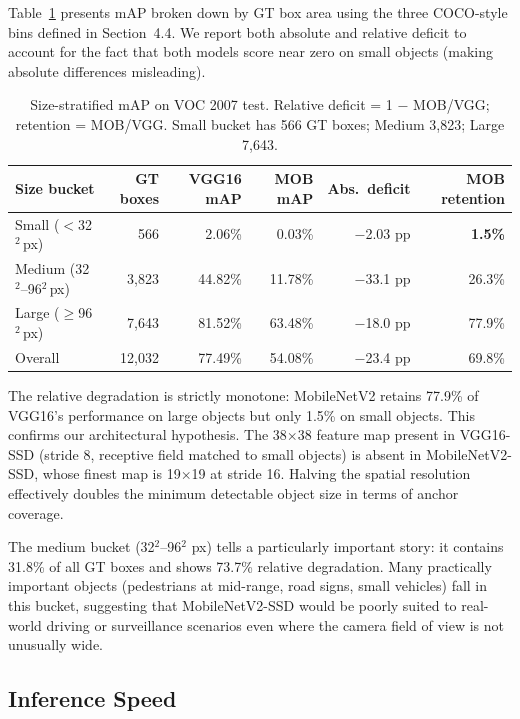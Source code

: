 \documentclass{article}
\begin{document}
Table~\ref{tab:size} presents mAP broken down by GT box area using the three COCO-style bins defined in Section~4.4. We report both absolute and relative deficit to account for the fact that both models score near zero on small objects (making absolute differences misleading).

\begin{table}[h]
  \caption{Size-stratified mAP on VOC 2007 test. Relative deficit = 1 $-$ MOB/VGG; retention = MOB/VGG. Small bucket has 566 GT boxes; Medium 3,823; Large 7,643.}
  \label{tab:size}
  \centering
  \begin{tabular}{lrrrrr}
    \toprule
    Size bucket & GT boxes & VGG16 mAP & MOB mAP & Abs.\ deficit & MOB retention \\
    \midrule
    Small  ($<$32$^2$\,px)     &    566 &  2.06\% &  0.03\% & $-$2.03 pp & \textbf{1.5\%} \\
    Medium (32$^2$–96$^2$\,px) &  3,823 & 44.82\% & 11.78\% & $-$33.1 pp & 26.3\% \\
    Large  ($\geq$96$^2$\,px)  &  7,643 & 81.52\% & 63.48\% & $-$18.0 pp & 77.9\% \\
    \midrule
    Overall                    & 12,032 & 77.49\% & 54.08\% & $-$23.4 pp & 69.8\% \\
    \bottomrule
  \end{tabular}
\end{table}

The relative degradation is strictly monotone: MobileNetV2 retains 77.9\% of VGG16's performance on large objects but only 1.5\% on small objects. This confirms our architectural hypothesis. The 38$\times$38 feature map present in VGG16-SSD (stride 8, receptive field matched to small objects) is absent in MobileNetV2-SSD, whose finest map is 19$\times$19 at stride 16. Halving the spatial resolution effectively doubles the minimum detectable object size in terms of anchor coverage.

The medium bucket (32$^2$–96$^2$ px) tells a particularly important story: it contains 31.8\% of all GT boxes and shows 73.7\% relative degradation. Many practically important objects (pedestrians at mid-range, road signs, small vehicles) fall in this bucket, suggesting that MobileNetV2-SSD would be poorly suited to real-world driving or surveillance scenarios even where the camera field of view is not unusually wide.

\subsection{Inference Speed}
\label{sec:speed}
\end{document}
